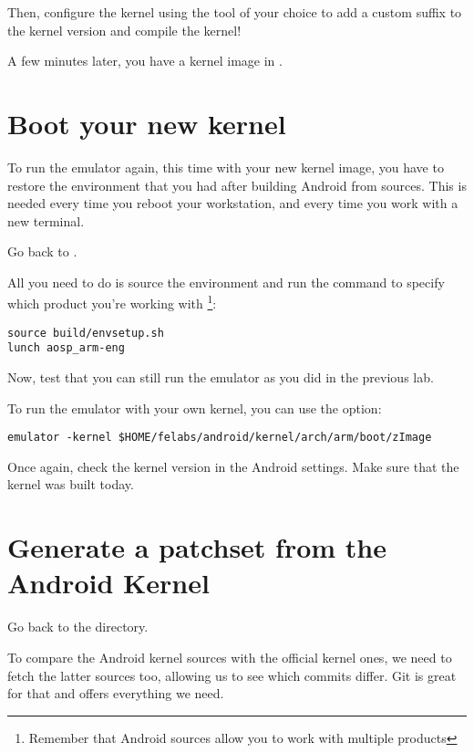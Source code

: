 Then, configure the kernel using the tool of your choice to add a
custom suffix to the kernel version and compile the kernel!


A few minutes later, you have a kernel image in .

\section{Boot your new kernel}

To run the emulator again, this time with your new kernel image, you
have to restore the environment that you had after building Android
from sources. This is needed every time you reboot your workstation,
and every time you work with a new terminal.

Go back to .

All you need to do is source the environment and run the 
command to specify which product you're working with
\footnote{Remember that Android sources allow you to work with
  multiple products}:

\begin{verbatim}
source build/envsetup.sh
lunch aosp_arm-eng
\end{verbatim}

Now, test that you can still run the emulator as you did in the
previous lab.

To run the emulator with your own kernel, you can use the
 option:

\begin{verbatim}
emulator -kernel $HOME/felabs/android/kernel/arch/arm/boot/zImage
\end{verbatim}

Once again, check the kernel version in the Android settings. Make
sure that the kernel was built today.

\section{Generate a patchset from the Android Kernel}

Go back to the  directory.

To compare the Android kernel sources with the official kernel ones,
we need to fetch the latter sources too, allowing us to see which
commits differ. Git is great for that and offers everything we need.

